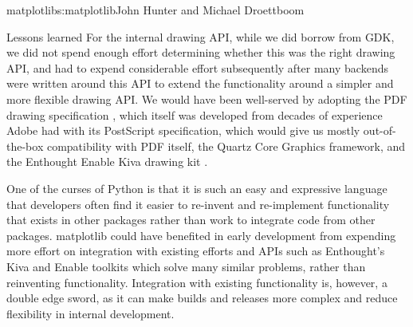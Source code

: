 \begin{aosachapter}{matplotlib}{s:matplotlib}{John Hunter and Michael Droettboom}
\begin{aosasect1}{Lessons learned}
For the internal drawing API, while we did borrow from GDK, we did not
spend enough effort determining whether this was the right drawing
API, and had to expend considerable effort subsequently after many
backends were written around this API to extend the functionality
around a simpler and more flexible drawing API.  We would have been
well-served by adopting the PDF drawing specification \cite{bib:pdf},
which itself was developed from decades of experience Adobe had with
its PostScript specification, which would give us mostly
out-of-the-box compatibility with PDF itself, the Quartz Core Graphics
framework, and the Enthought Enable Kiva drawing kit \cite{bib:kiva}.

One of the curses of Python is that it is such an easy and expressive
language that developers often find it easier to re-invent and
re-implement functionality that exists in other packages rather than
work to integrate code from other packages.  matplotlib could have
benefited in early development from expending more effort on
integration with existing efforts and APIs such as Enthought's Kiva
and Enable toolkits which solve many similar problems, rather than
reinventing functionality.  Integration with existing functionality
is, however, a double edge sword, as it can make builds and releases
more complex and reduce flexibility in internal development.

\end{aosasect1}
\end{aosachapter}
